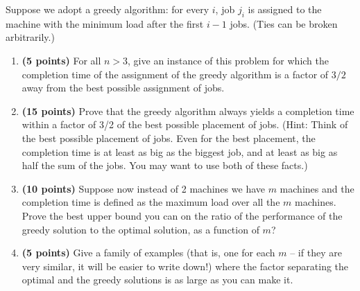 \documentclass[11pt]{article}
\begin{document}
\begin{enumerate}
Suppose we adopt a greedy algorithm: for every $i$, job $j_i$ is assigned to the
machine with the minimum load after the first $i-1$ jobs.  (Ties can
be broken arbitrarily.) 
\begin{enumerate}
\item
{\bf (5 points)} 
For all $n > 3$, give an instance of this problem for which
the completion time of the assignment of the greedy algorithm is a factor of $3/2$ away from the best
possible assignment of jobs.
\item
{\bf (15 points)}
Prove that the greedy algorithm always yields a completion
time within a factor of 3/2 of the best possible placement of jobs.
(Hint: Think of the best possible placement of jobs.  Even for the
best placement, the completion time is at least as big as the biggest
job, and at least as big as half the sum of the jobs.  You may want to
use both of these facts.)
\item
{\bf (10 points)} 
Suppose now instead of 2 machines we have $m$ machines and the completion time is defined as the maximum load over all the $m$ machines.  
Prove the best upper bound you can on the ratio of the 
performance of the greedy solution to the optimal solution, as a
function of $m$? 
\item
{\bf (5 points)} 
Give a family of examples (that is, one for
each $m$ -- if they are very similar, it will be easier to write
down!) where the factor separating the optimal and the greedy solutions
is as large as you can make it.
\end{enumerate}


\end{enumerate}
\end{document}
